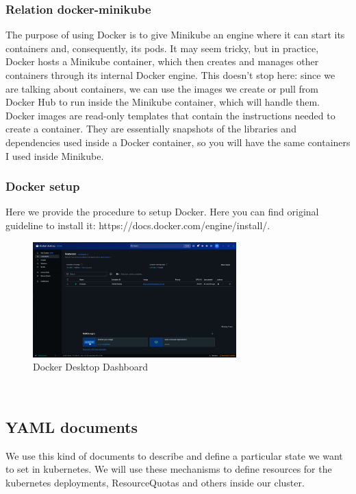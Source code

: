 \subsubsection{Relation docker-minikube}
The purpose of using Docker is to give Minikube an engine where it can start its containers and, consequently, its pods. It may seem tricky, but in practice, Docker hosts a Minikube container, which then creates and manages other containers through its internal Docker engine. This doesn’t stop here: since we are talking about containers, we can use the images we create or pull from Docker Hub to run inside the Minikube container, which will handle them. \\
Docker images are read-only templates that contain the instructions needed to create a container. They are essentially snapshots of the libraries and dependencies used inside a Docker container, so you will have the same containers I used inside Minikube.
\subsubsection{Docker setup}
Here we provide the procedure to setup Docker. Here you can find original guideline to install it: https://docs.docker.com/engine/install/. 
\begin{figure}[h!]
    \centering
    \includegraphics[width=0.7\textwidth]{images/docker_dashboard.png}
    \caption{Docker Desktop Dashboard}
    \label{fig:docker desktop}
\end{figure} \\

\subsection{YAML documents}
\label{subsec:YAML}
We use this kind of documents to describe and define a particular state we want to set in kubernetes. We will use these mechanisms to define resources for the kubernetes deployments, ResourceQuotas and others inside our cluster.

